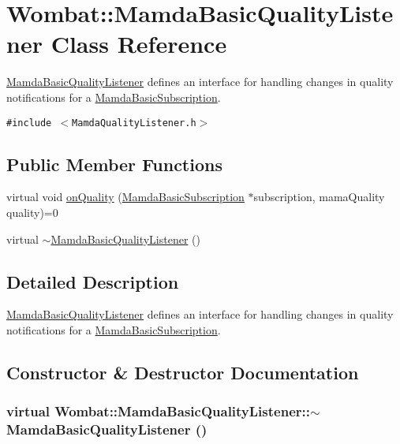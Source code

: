\hypertarget{classWombat_1_1MamdaBasicQualityListener}{
\section{Wombat::Mamda\-Basic\-Quality\-Listener Class Reference}
\label{classWombat_1_1MamdaBasicQualityListener}
}
\hyperlink{classWombat_1_1MamdaBasicQualityListener}{Mamda\-Basic\-Quality\-Listener} defines an interface for handling changes in quality notifications for a \hyperlink{classWombat_1_1MamdaBasicSubscription}{Mamda\-Basic\-Subscription}.  


{\tt \#include $<$Mamda\-Quality\-Listener.h$>$}

\subsection*{Public Member Functions}
\begin{CompactItemize}
\item 
virtual void \hyperlink{classWombat_1_1MamdaBasicQualityListener_1d0c0ead50c8e1c0598d7b0e15864579}{on\-Quality} (\hyperlink{classWombat_1_1MamdaBasicSubscription}{Mamda\-Basic\-Subscription} $\ast$subscription, mama\-Quality quality)=0
\item 
virtual \hyperlink{classWombat_1_1MamdaBasicQualityListener_0b4559fa06d1661dd611492dae343cc1}{$\sim$Mamda\-Basic\-Quality\-Listener} ()
\end{CompactItemize}


\subsection{Detailed Description}
\hyperlink{classWombat_1_1MamdaBasicQualityListener}{Mamda\-Basic\-Quality\-Listener} defines an interface for handling changes in quality notifications for a \hyperlink{classWombat_1_1MamdaBasicSubscription}{Mamda\-Basic\-Subscription}. 



\subsection{Constructor \& Destructor Documentation}
\hypertarget{classWombat_1_1MamdaBasicQualityListener_0b4559fa06d1661dd611492dae343cc1}{
\subsubsection[$\sim$MamdaBasicQualityListener]{\setlength{\rightskip}{0pt plus 5cm}virtual Wombat::Mamda\-Basic\-Quality\-Listener::$\sim$Mamda\-Basic\-Quality\-Listener ()}}
\label{classWombat_1_1MamdaBasicQualityListener_0b4559fa06d1661dd611492dae343cc1}




